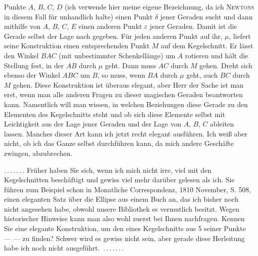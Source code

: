 %
Punkte $A$, $B$, $C$, $D$ (ich verwende hier meine eigene Bezeichnung, da ich \textsc{Newtons}
in diesem Fall für unhandlich halte) einen Punkt $\delta$ jener Geraden
sucht und dann mithilfe von $A$, $B$, $C$, $E$ einen anderen Punkt $\varepsilon$ jener
Geraden. Damit ist die Gerade selbst der Lage nach gegeben. Für jeden anderen
Punkt auf ihr, $\mu$, liefert seine Konstruktion einen entsprechenden
Punkt $M$ auf dem Kegelschnitt. Er lässt den Winkel $BAC$ (mit unbestimmter Schenkellänge)
um $A$ rotieren und hält die Stellung fest, in der $AB$ durch $\mu$ geht. Dann muss $AC$
durch $M$ gehen. Dreht sich ebenso der Winkel $ABC$ um $B$, so muss, wenn
$BA$ durch $\mu$ geht, auch $BC$ durch $M$ gehen. Diese Konstruktion ist
überaus elegant, aber Herr der Sache ist man erst, wenn man
alle anderen Fragen zu dieser magischen Geraden beantworten kann.
Namentlich will man wissen, in welchen Beziehungen diese Gerade zu den Elementen des
Kegelschnitts steht und ob sich diese Elemente selbst mit Leichtigkeit aus der Lage jener
Geraden und der Lage von $A$, $B$, $C$ ableiten lassen. Manches dieser Art kann
ich jetzt recht elegant ausführen. Ich weiß aber nicht, ob ich das Ganze selbst
durchführen kann, da mich andere Geschäfte zwingen, abzubrechen.

\mbox{.\,.\,.\,.\,.\,.\,.} Früher haben Sie sich, wenn ich mich nicht irre, viel mit den Kegelschnitten
beschäftigt und gewiss viel mehr darüber gelesen als ich. Sie führen zum Beispiel schon in
Monatliche Correspondenz, 1810 November, S. 508, einen eleganten Satz über die Ellipse
aus einem Buch an, das ich bisher noch nicht angesehen habe, obwohl unsere Bibliothek es
vermutlich besitzt. Wegen historischer Hinweise kann man also wohl zuerst bei Ihnen nachfragen.
Kennen Sie eine elegante Konstruktion, um den 
eines Kegelschnitts aus 5 seiner Punkte ---  --- zu
finden? Schwer wird es gewiss nicht sein, aber gerade diese Herleitung habe ich noch
nicht \mbox{ausgeführt. .\,.\,.\,.\,.\,.\,.}
